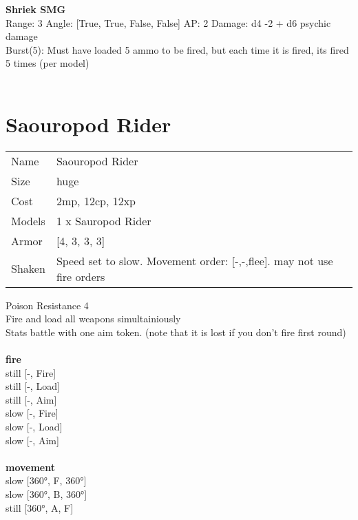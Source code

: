 {\bf Shriek SMG } \\



Range: 3  Angle: [True, True, False, False] AP: 2 Damage: d4 -2 + d6 psychic damage \\
Burst(5): Must have loaded 5 ammo to be fired, but each time it is fired, its fired 5 times (per model)\\ 




 
\ \\













\clearpage

\section{ Saouropod Rider }

\begin{tabular}{ll}
  Name & Saouropod Rider \\
  Size & huge\\
  Cost & 2mp, 12cp, 12xp\\
  Models & 1 x Sauropod Rider\\
  Armor & [4, 3, 3, 3]\\
  Shaken & Speed set to slow. Movement order: [-,-,flee]. may not use fire orders\\
\end{tabular}

\noindent Poison Resistance 4\\ 
Fire and load all weapons simultainiously\\ 
Stats battle with one aim token. (note that it is lost if you don't fire first round)\\ 


\ \\ {\bf fire } \\
still [-, Fire] \\
still [-, Load] \\
still [-, Aim] \\
slow [-, Fire] \\
slow [-, Load] \\
slow [-, Aim] \\
\ \\ {\bf movement } \\
slow [360°, F, 360°] \\
slow [360°, B, 360°] \\
still [360°, A, F] \\


